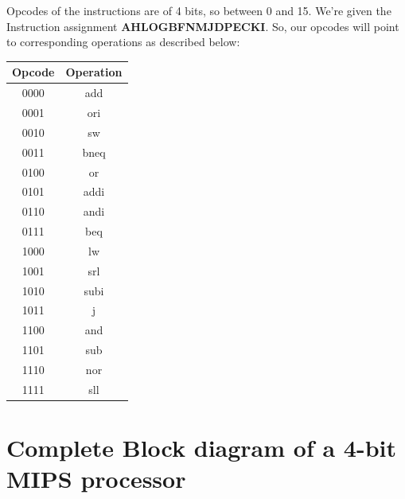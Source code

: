 \documentclass[a4paper]{article}
\begin{document}
Opcodes of the instructions are of 4 bits, so between 0 and 15. We’re given the Instruction assignment \textbf{AHLOGBFNMJDPECKI}. So, our opcodes will point to corresponding operations as described below:


\begin{table}[H]
    \centering
    \begin{tabular}{|c|c|}
    \hline
         Opcode & Operation \\
         \hline
            0000 & add\\
            \hline
            0001 & ori\\
            \hline
            0010 & sw\\
            \hline
            0011 & bneq\\
            \hline
            0100 & or\\
            \hline
            0101 & addi\\
            \hline
            0110 & andi\\
            \hline
            0111 & beq\\
            \hline
            1000 & lw\\
            \hline
            1001 & srl\\
            \hline
            1010 & subi\\
            \hline
            1011 & j\\
            \hline
            1100 & and\\
            \hline
            1101 & sub\\
            \hline
            1110 & nor\\
            \hline
            1111 & sll\\
            \hline
    \end{tabular}
\end{table}

\section{Complete Block diagram of a 4-bit MIPS processor}
\end{document}
